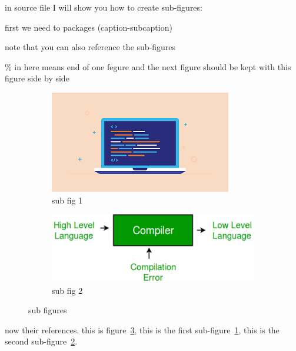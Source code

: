 \documentclass{article} %
\begin{document}
\begin{itemize}
        in source file I will show you how to create sub-figures:
        
        \qquad first we need to packages (caption-subcaption)
        
        \qquad note that you can also reference the sub-figures
        
        \qquad \% in here means end of one fegure and the next figure should be kept with this figure side by side
        
        \begin{figure}[h]
            \centering
            
                \begin{subfigure}[b]{0.2\textwidth}
                    \centering
                        \includegraphics[scale=0.3]{fig1.png}
                    \caption{sub fig 1}
                    \label{fig:sub1}
                \end{subfigure}%
                \begin{subfigure}[b]{0.2\textwidth}
                    \centering
                        \includegraphics[scale=0.2]{fig2.png}
                    \caption{sub fig 2}
                    \label{fig:sub2}
                \end{subfigure}%

            \caption{sub figures}
            \label{fig:fig}
        \end{figure}

        now their references. this is figure~\ref{fig:fig}, this is the first sub-figure~\ref{fig:sub1}, this is the second sub-figure~\ref{fig:sub2}.
        
    \end{itemize}
    
\end{document}
